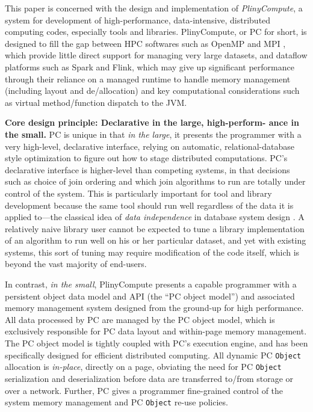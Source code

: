 This paper is concerned with the design and implementation of
\emph{PlinyCompute}, a system for development of
high-performance, data-intensive, distributed computing codes, especially tools and libraries.
PlinyCompute, or PC for short, is designed to fill the gap between
HPC softwares such as OpenMP \cite{dagum1998openmp} and MPI \cite{gropp1996high}, which provide little direct support for
managing very large datasets, and dataflow platforms such as Spark and Flink, which 
may give up significant performance through their reliance on a managed runtime to handle
memory management (including layout and de/allocation) and key computational considerations
such as virtual method/function dispatch to the JVM. 

\vspace{5 pt}
\noindent
\textbf{Core design principle: Declarative in the large, high-perform-
  ance in the small.}
PC is unique in that \emph{in the large}, 
it presents the programmer with a very high-level,
declarative interface, relying on automatic, 
relational-database style optimization \cite{chaudhuri1998overview} to figure out how to stage
distributed computations.  
PC's declarative interface is higher-level than competing systems, in that decisions such as choice of join ordering and which
join algorithms to run are
totally under control of the system. 
This is particularly important for tool and library development because the same tool should run well regardless of the data
it is applied to---the classical idea of \emph{data independence} in database system design \cite{stonebraker1990third}.
A relatively naive library user cannot be expected to tune a library implementation of an algorithm to run
well on his or her particular dataset, and yet with existing systems, this sort of tuning
may require modification of the
code itself, which is beyond the vast majority of end-users.

In contrast, \emph{in the small}, PlinyCompute presents a capable programmer with a
persistent object data model and API (the ``PC object model'') and associated memory management system
designed from the ground-up for
high performance.
All data processed by PC are managed by
the PC object
model, which is exclusively responsible for PC data layout and within-page memory management.  
The PC object model is tightly coupled with
PC's execution engine, and has been specifically designed for efficient distributed computing.  
All dynamic PC \texttt{Object} allocation is \emph{in-place}, directly on a page, obviating
the need for PC \texttt{Object} serialization and deserialization
before data are transferred to/from storage or over a network.
Further, PC gives a programmer fine-grained control of the system
memory management and PC \texttt{Object} re-use policies.

